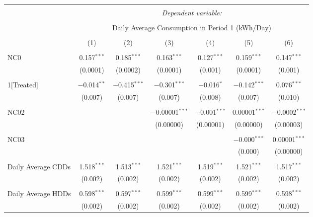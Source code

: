 
\begin{table}[!htbp] \centering 
  \caption{} 
  \label{} 
\small 
\begin{tabular}{@{\extracolsep{5pt}}lcccccc} 
\\[-1.8ex]\hline 
\hline \\[-1.8ex] 
 & \multicolumn{6}{c}{\textit{Dependent variable:}} \\ 
\cline{2-7} 
\\[-1.8ex] & \multicolumn{6}{c}{Daily Average Consumption in Period 1 (kWh/Day)} \\ 
\\[-1.8ex] & (1) & (2) & (3) & (4) & (5) & (6)\\ 
\hline \\[-1.8ex] 
 NC0 & 0.157$^{***}$ & 0.185$^{***}$ & 0.163$^{***}$ & 0.127$^{***}$ & 0.159$^{***}$ & 0.147$^{***}$ \\ 
  & (0.0001) & (0.0002) & (0.0001) & (0.001) & (0.0001) & (0.001) \\ 
  & & & & & & \\ 
 1[Treated] & $-$0.014$^{**}$ & $-$0.415$^{***}$ & $-$0.301$^{***}$ & $-$0.016$^{*}$ & $-$0.142$^{***}$ & 0.076$^{***}$ \\ 
  & (0.007) & (0.007) & (0.007) & (0.008) & (0.007) & (0.010) \\ 
  & & & & & & \\ 
 NC02 &  &  & $-$0.00001$^{***}$ & $-$0.001$^{***}$ & 0.00001$^{***}$ & $-$0.0002$^{***}$ \\ 
  &  &  & (0.00000) & (0.00001) & (0.00000) & (0.00003) \\ 
  & & & & & & \\ 
 NC03 &  &  &  &  & $-$0.000$^{***}$ & 0.00001$^{***}$ \\ 
  &  &  &  &  & (0.000) & (0.00000) \\ 
  & & & & & & \\ 
 Daily Average CDDs & 1.518$^{***}$ & 1.513$^{***}$ & 1.521$^{***}$ & 1.519$^{***}$ & 1.521$^{***}$ & 1.517$^{***}$ \\ 
  & (0.002) & (0.002) & (0.002) & (0.002) & (0.002) & (0.002) \\ 
  & & & & & & \\ 
 Daily Average HDDs & 0.598$^{***}$ & 0.597$^{***}$ & 0.599$^{***}$ & 0.599$^{***}$ & 0.599$^{***}$ & 0.598$^{***}$ \\ 
  & (0.002) & (0.002) & (0.002) & (0.002) & (0.002) & (0.002) \\ 

\end{tabular}
\end{table}
